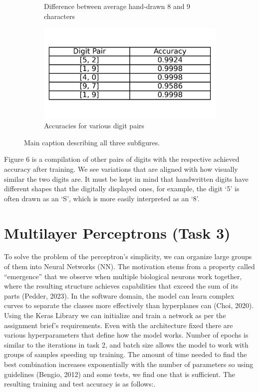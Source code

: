 \documentclass{article}
\begin{document}
\begin{figure}[h!]
\begin{subfigure}[t]{0.3\textwidth}
        \caption{Difference between average hand-drawn 8 and 9 characters}
        \label{fig:plot7b}
    \end{subfigure}
    \hspace{0.01\textwidth}
    \begin{subfigure}[t]{0.3\textwidth}
        \centering
        \includegraphics[width=\textwidth]{./plots/plot8.png} %
        \caption{Accuracies for various digit pairs}
        \label{fig:plot7c}
    \end{subfigure}

    \caption{Main caption describing all three subfigures.}
    \label{fig:main_figure}
\end{figure}

Figure 6 is a compilation of other pairs of digits with the respective achieved accuracy after training.
We see variations that are aligned with how visually similar the two digits are.
It must be kept in mind that handwritten digits have different shapes that the digitally displayed ones, for example, the digit ‘5’ is often drawn as an ‘S’, which is more easily interpreted as an ‘8’.

\section{Multilayer Perceptrons (Task 3)}

To solve the problem of the perceptron’s simplicity, we can organize large groups of them into Neural Networks (NN).
The motivation stems from a property called “emergence” that we observe when multiple biological neurons work together, where the resulting structure achieves capabilities that exceed the sum of its parts (Pedder, 2023).
In the software domain, the model can learn complex curves to separate the classes more effectively than hyperplanes can (Choi, 2020).
Using the Keras Library we can initialize and train a network as per the assignment brief’s requirements.
Even with the architecture fixed there are various hyperparameters that define how the model works.
Number of epochs is similar to the iterations in task 2, and batch size allows the model to work with groups of samples speeding up training.
The amount of time needed to find the best combination increases exponentially with the number of parameters so using guidelines (Bengio, 2012) and some tests, we find one that is sufficient.
The resulting training and test accuracy is as follows:.
\end{document}
